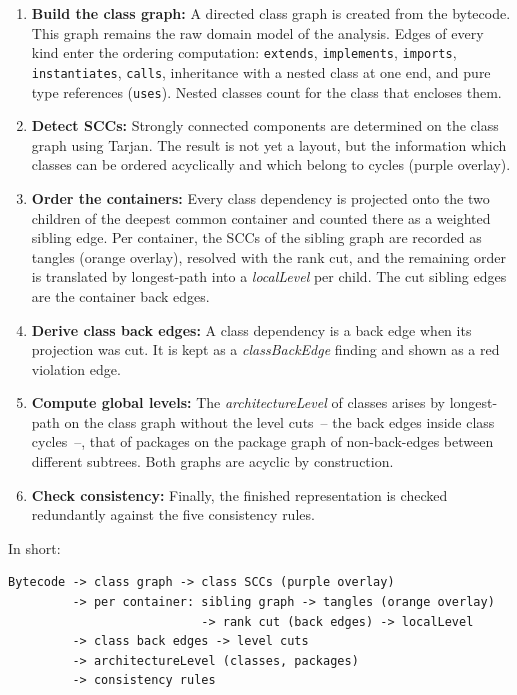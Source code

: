\documentclass[a4paper,11pt]{article}
\begin{document}
\begin{enumerate}
  \item \textbf{Build the class graph:} A directed class graph is created from
        the bytecode. This graph remains the raw domain model of the analysis.
        Edges of every kind enter the ordering computation:
        \texttt{extends}, \texttt{implements}, \texttt{imports},
        \texttt{instantiates}, \texttt{calls}, inheritance with a nested class
        at one end, and pure type references (\texttt{uses}). Nested classes
        count for the class that encloses them.
  \item \textbf{Detect SCCs:} Strongly connected components are determined on
        the class graph using Tarjan. The result is not yet a layout, but the
        information which classes can be ordered acyclically and which belong
        to cycles (purple overlay).
  \item \textbf{Order the containers:} Every class dependency is projected onto
        the two children of the deepest common container and counted there as a
        weighted sibling edge. Per container, the SCCs of the sibling graph are
        recorded as tangles (orange overlay), resolved with the rank cut, and
        the remaining order is translated by longest-path into a
        \emph{localLevel} per child. The cut sibling edges are the container
        back edges.
  \item \textbf{Derive class back edges:} A class dependency is a back edge
        when its projection was cut. It is kept as a \emph{classBackEdge}
        finding and shown as a red violation edge.
  \item \textbf{Compute global levels:} The \emph{architectureLevel} of
        classes arises by longest-path on the class graph without the level
        cuts~-- the back edges inside class cycles~--, that of packages on the
        package graph of non-back-edges between different subtrees. Both
        graphs are acyclic by construction.
  \item \textbf{Check consistency:} Finally, the finished representation is
        checked redundantly against the five consistency rules.
\end{enumerate}

In short:

\begin{lstlisting}
Bytecode -> class graph -> class SCCs (purple overlay)
         -> per container: sibling graph -> tangles (orange overlay)
                           -> rank cut (back edges) -> localLevel
         -> class back edges -> level cuts
         -> architectureLevel (classes, packages)
         -> consistency rules
\end{lstlisting}
\end{document}
